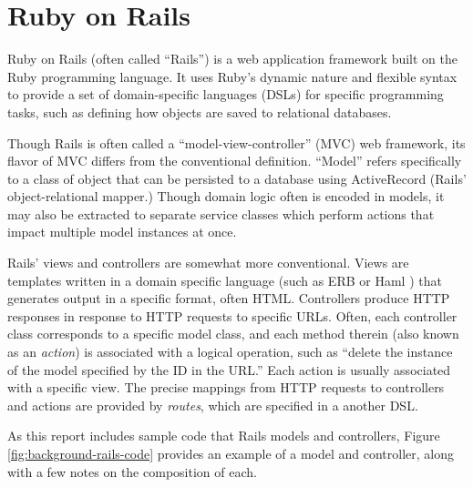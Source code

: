 \documentclass[document.tex]{subfiles}
\begin{document}
\section {Ruby on Rails}

Ruby on Rails \cite{rails} (often called ``Rails'') is a web application framework built on the Ruby programming language. It uses Ruby's dynamic nature and flexible syntax to provide a set of domain-specific languages (DSLs) for specific programming tasks, such as defining how objects are saved to relational databases.

Though Rails is often called a ``model-view-controller'' (MVC) web framework, its flavor of MVC differs from the conventional definition. ``Model'' refers specifically to a class of object that can be persisted to a database using ActiveRecord (Rails' object-relational mapper.) Though domain logic often is encoded in models, it may also be extracted to separate service classes which perform actions that impact multiple model instances at once.

Rails' views and controllers are somewhat more conventional. Views are templates written in a domain specific language (such as ERB \cite{erb} or Haml \cite{haml}) that generates output in a specific format, often HTML. Controllers produce HTTP responses in response to HTTP requests to specific URLs. Often, each controller class corresponds to a specific model class, and each method therein (also known as an \emph{action}) is associated with a logical operation, such as ``delete the instance of the model specified by the ID in the URL.'' Each action is usually associated with a specific view. The precise mappings from HTTP requests to controllers and actions are provided by \emph{routes}, which are specified in a another DSL.


As this report includes sample code that Rails models and controllers, Figure \ref{fig:background-rails-code} provides an example of a model and controller, along with a few notes on the composition of each.
\end{document}
